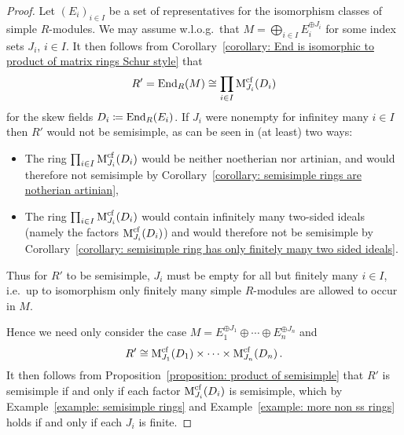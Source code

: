 \begin{proof}
  Let $(E_i)_{i \in I}$ be a set of representatives for the isomorphism classes of simple $R$-modules.
  We may assume w.l.o.g.\ that $M = \bigoplus_{i \in I} E_i^{\oplus J_i}$ for some index sets $J_i$, $i \in I$.
  It then follows from Corollary~\ref{corollary: End is isomorphic to product of matrix rings Schur style} that
  \[
          R'
    =     \operatorname{End}_R(M)
    \cong \prod_{i \in I} \operatorname{M}_{J_i}^{{\operatorname{cf}}}(D_i)
  \]
  for the skew fields $D_i \coloneqq \operatorname{End}_R(E_i)$.
  If $J_i$ were nonempty for infinitey many $i \in I$ then $R'$ would not be semisimple, as can be seen in (at least) two ways:
  \begin{itemize}
    \item
      The ring $\prod_{i \in I} \operatorname{M}_{J_i}^{{\operatorname{cf}}}(D_i)$ would be neither noetherian nor artinian, and would therefore not semisimple by Corollary~\ref{corollary: semisimple rings are notherian artinian},
    \item
      The ring $\prod_{i \in I} \operatorname{M}_{J_i}^{{\operatorname{cf}}}(D_i)$ would contain infinitely many two-sided ideals (namely the factors $\operatorname{M}_{J_i}^{{\operatorname{cf}}}(D_i)$) and would therefore not be semisimple by Corollary~\ref{corollary: semisimple ring has only finitely many two sided ideals}.
  \end{itemize}
  Thus for $R'$ to be semisimple, $J_i$ must be empty for all but finitely many $i \in I$, i.e.\ up to isomorphism only finitely many simple $R$-modules are allowed to occur in $M$.
  
  Hence we need only consider the case $M = E_1^{\oplus J_1} \oplus \dotsb \oplus E_n^{\oplus J_n}$ and
  \[
          R'
    \cong \operatorname{M}_{J_1}^{{\operatorname{cf}}}(D_1) \times \dotsb \times \operatorname{M}_{J_n}^{{\operatorname{cf}}}(D_n) \,.
  \]
  It then follows from Proposition~\ref{proposition: product of semisimple} that $R'$ is semisimple if and only if each factor $\operatorname{M}_{J_i}^{{\operatorname{cf}}}(D_i)$ is semisimple, which by Example~\ref{example: semisimple rings} and Example~\ref{example: more non ss rings} holds if and only if each $J_i$ is finite.
\end{proof}


